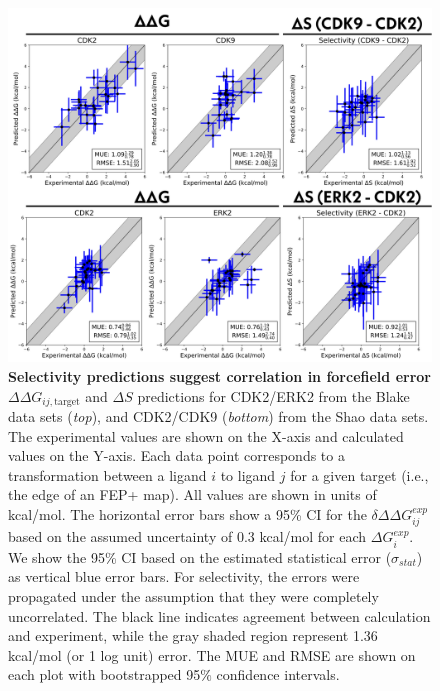 \documentclass[phd,tocprelim]{cornell}
\begin{document}
\begin{landscape}
\begin{figure}
\centering
\includegraphics[width=0.6\linewidth]{figures/Figure4.png}
\caption[Selectivity predictions suggest correlation in forcefield error.]{
{\bf Selectivity predictions suggest correlation in forcefield error} \\
$\Delta \Delta G_{ij, \text{target}}$ and $\Delta S$ predictions for CDK2/ERK2 from the Blake data sets (\emph{top}), and CDK2/CDK9 (\emph{bottom}) from the Shao data sets. The experimental values are shown on the X-axis and calculated values on the Y-axis. Each data point corresponds to a transformation between a ligand $i$ to ligand $j$ for a given target (i.e., the edge of an FEP+ map). All values are shown in units of kcal/mol. The horizontal error bars show a 95\% CI for the $\delta \Delta \Delta G^{exp}_{ij}$ based on the assumed uncertainty of 0.3 kcal/mol\citep{BROWN2009420,Kalliokoski:PloSOne:2013} for each $\Delta G^{exp}_{i}$. We show the 95\% CI based on the estimated statistical error ($\sigma_{stat}$) as vertical blue error bars. For selectivity, the errors were propagated under the assumption that they were completely uncorrelated. The black line indicates agreement between calculation and experiment, while the gray shaded region represent 1.36 kcal/mol (or 1 log unit) error. The MUE and RMSE are shown on each plot with bootstrapped 95$\%$ confidence intervals.
}
\label{fig:figure-4}
\end{figure}
\end{landscape}
\end{document}
